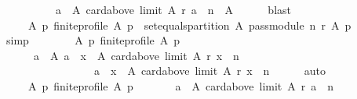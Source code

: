 \begin{isabellebody}
\ \ \ \ \ \ \ \ \ \ {\isacharbraceleft}{\kern0pt}a\ {\isasymin}\ A{\isachardot}{\kern0pt}\ card{\isacharparenleft}{\kern0pt}above\ {\isacharparenleft}{\kern0pt}limit\ A\ r{\isacharparenright}{\kern0pt}\ a{\isacharparenright}{\kern0pt}\ {\isasymle}\ n{\isacharbraceright}{\kern0pt}\ {\isacharequal}{\kern0pt}\ A{\isachardoublequoteclose}\isanewline
\ \ \ \ \isamarkupfalse%
\ blast\isanewline
\ \ \isamarkupfalse%
\ {}{\isacharcolon}{\kern0pt}\isanewline
\ \ \ \ {\isachardoublequoteopen}{\isasymforall}\ A\ p{\isachardot}{\kern0pt}\ finite{\isacharunderscore}{\kern0pt}profile\ A\ p\ {\isasymlongrightarrow}\ set{\isacharunderscore}{\kern0pt}equals{\isacharunderscore}{\kern0pt}partition\ A\ {\isacharparenleft}{\kern0pt}pass{\isacharunderscore}{\kern0pt}module\ n\ r\ A\ p{\isacharparenright}{\kern0pt}{\isachardoublequoteclose}\isanewline
\ \ \ \ \isamarkupfalse%
\ simp\isanewline
\ \ \isamarkupfalse%
\isanewline
\ \ \ \ {\isachardoublequoteopen}{\isasymforall}\ A\ p{\isachardot}{\kern0pt}\ finite{\isacharunderscore}{\kern0pt}profile\ A\ p\ {\isasymlongrightarrow}\isanewline
\ \ \ \ \ \ {\isacharparenleft}{\kern0pt}{\isasymforall}a\ {\isasymin}\ A{\isachardot}{\kern0pt}\ {\isasymnot}{\isacharparenleft}{\kern0pt}a\ {\isasymin}\ {\isacharbraceleft}{\kern0pt}x\ {\isasymin}\ A{\isachardot}{\kern0pt}\ card{\isacharparenleft}{\kern0pt}above\ {\isacharparenleft}{\kern0pt}limit\ A\ r{\isacharparenright}{\kern0pt}\ x{\isacharparenright}{\kern0pt}\ {\isachargreater}{\kern0pt}\ n{\isacharbraceright}{\kern0pt}\ {\isasymand}\isanewline
\ \ \ \ \ \ \ \ \ \ \ \ \ \ \ \ \ a\ {\isasymin}\ {\isacharbraceleft}{\kern0pt}x\ {\isasymin}\ A{\isachardot}{\kern0pt}\ card{\isacharparenleft}{\kern0pt}above\ {\isacharparenleft}{\kern0pt}limit\ A\ r{\isacharparenright}{\kern0pt}\ x{\isacharparenright}{\kern0pt}\ {\isasymle}\ n{\isacharbraceright}{\kern0pt}{\isacharparenright}{\kern0pt}{\isacharparenright}{\kern0pt}{\isachardoublequoteclose}\isanewline
\ \ \ \ \isamarkupfalse%
\ auto\isanewline
\ \ \isamarkupfalse%
\isanewline
\ \ \ \ {\isachardoublequoteopen}{\isasymforall}\ A\ p{\isachardot}{\kern0pt}\ finite{\isacharunderscore}{\kern0pt}profile\ A\ p\ {\isasymlongrightarrow}\isanewline
\ \ \ \ \ \ {\isacharbraceleft}{\kern0pt}a\ {\isasymin}\ A{\isachardot}{\kern0pt}\ card{\isacharparenleft}{\kern0pt}above\ {\isacharparenleft}{\kern0pt}limit\ A\ r{\isacharparenright}{\kern0pt}\ a{\isacharparenright}{\kern0pt}\ {\isachargreater}{\kern0pt}\ n{\isacharbraceright}{\kern0pt}\ {\isasyminter}\isanewline

\end{isabellebody}

